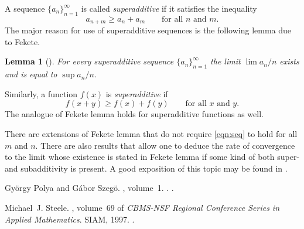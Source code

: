 \documentclass[12pt]{article}
\newtheorem*{lemma}{Lemma}
\begin{document}
A sequence $\{a_n\}_{n=1}^\infty$ is called \emph{superadditive} if
it satisfies the inequality
\begin{equation}\label{eqn:seq}
a_{n+m}\geq a_n+a_m\qquad\text{for all $n$ and $m$}.
\end{equation}
The major reason for use of superadditive sequences is the following
lemma due to Fekete.
\begin{lemma}[\cite{cite:polya_szegoi}]
For every superadditive sequence $\{a_n\}_{n=1}^\infty$ the limit
$\lim a_n/n$ exists and is equal to $\sup a_n/n$.
\end{lemma}

Similarly, a function $f(x)$ is \emph{superadditive} if
\begin{equation*}
f(x+y)\geq f(x)+f(y)\qquad\text{for all $x$ and $y$}.
\end{equation*}
The analogue of Fekete lemma holds for superadditive functions as
well.

There are extensions of Fekete lemma that do not require \eqref{eqn:seq} to hold for all $m$ and $n$. There are also results that allow one to deduce the rate of convergence to the limit whose existence is stated in Fekete lemma if some kind of both super- and subadditivity is present. A good exposition of this topic may be found in \cite{cite:steele_azuma}.

\begin{thebibliography}{1}

Gy{\"o}rgy Polya and G{\'a}bor Szeg{\"o}.
, volume~1.
.
\newblock {}.

Michael~J. Steele.
, volume~69 of
  {\em CBMS-NSF Regional Conference Series in Applied Mathematics}.
\newblock SIAM, 1997.
\newblock {}.

\end{thebibliography}
\end{document}
